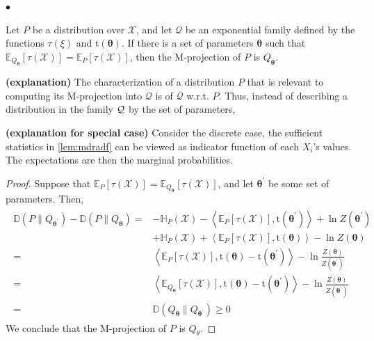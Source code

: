 \documentclass{article}
\newcommand{\bfs}[1]{\textbf{({#1}) }}
\begin{document}
$\bullet$  

\begin{thma}\label{thm:jdfkjsafads}
Let $P$ be a distribution over $\mathcal{X}$, and let $\mathcal{Q}$ be an exponential family defined by the functions $\tau(\xi)$ and $\mathrm{t}(\boldsymbol{\theta})$. If there is a set of parameters $\boldsymbol{\theta}$ such that $\mathbb{E}_{Q_{\boldsymbol{\theta}}}[\tau(\mathcal{X})]=\mathbb{E}_{P}[\tau(\mathcal{X})]$, then the M-projection of $P$ is $Q_{\boldsymbol{\theta}}$.
\end{thma}
\begin{rema}\bfs{explanation}
The characterization of a distribution $P$ that is relevant to computing its M-projection into $\mathcal{Q}$ is  of $\mathcal{Q}$ w.r.t. $P$. Thus, instead of describing a distribution in the family $\mathcal{Q}$ by the set of parameters, 
\end{rema}
\begin{rema}\bfs{explanation for special case}
Consider the discrete case, the sufficient statistics in \cref{lem:mdradf} can be viewed as indicator function of each $X_i$'s values. The expectations are then the marginal probabilities.
\end{rema}
\begin{proof}
Suppose that $\mathbb{E}_{P}[\tau(\mathcal{X})]=\mathbb{E}_{Q_{\boldsymbol{\theta}}}[\tau(\mathcal{X})]$, and let $\boldsymbol{\theta}^{\prime}$ be some set of parameters. Then,
\begin{align*}
\begin{aligned}
\mathbb{D}\left(P \| Q_{\boldsymbol{\theta}^{\prime}}\right)-\mathbb{D}\left(P \| Q_{\boldsymbol{\theta}}\right)=&-\mathbb{H}_{P}(\mathcal{X})-\left\langle\mathbb{E}_{P}[\tau(\mathcal{X})], \mathrm{t}\left(\boldsymbol{\theta}^{\prime}\right)\right\rangle+\ln Z\left(\boldsymbol{\theta}^{\prime}\right) \\
&+\mathbb{H}_{P}(\mathcal{X})+\left\langle\mathbb{E}_{P}[\tau(\mathcal{X})], \mathrm{t}(\boldsymbol{\theta})\right\rangle-\ln Z(\boldsymbol{\theta}) \\
=&\left\langle\mathbb{E}_{P}[\tau(\mathcal{X})], \mathrm{t}(\boldsymbol{\theta})-\mathrm{t}\left(\boldsymbol{\theta}^{\prime}\right)\right\rangle-\ln \frac{Z(\boldsymbol{\theta})}{Z\left(\boldsymbol{\theta}^{\prime}\right)} \\
=&\left\langle\mathbb{E}_{Q_{\boldsymbol{\theta}}}[\tau(\mathcal{X})], \mathrm{t}(\boldsymbol{\theta})-\mathrm{t}\left(\boldsymbol{\theta}^{\prime}\right)\right\rangle-\ln \frac{Z(\boldsymbol{\theta})}{Z\left(\boldsymbol{\theta}^{\prime}\right)} \\
=& \mathbb{D}\left(Q_{\boldsymbol{\theta}} \| Q_{\boldsymbol{\theta}^{\prime}}\right) \geq 0
\end{aligned}
\end{align*}
We conclude that the M-projection of $P$ is $Q_{\theta}$.
\end{proof}
\end{document}
